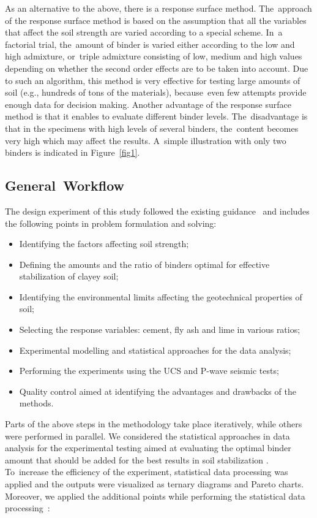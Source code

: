 \documentclass[constrmater,article,accept,pdftex,moreauthors]{Definitions/mdpi}
\begin{document}
As an alternative to the above, there is a response surface method. The~approach of the response surface method is based on the assumption that all the variables that affect the soil strength are varied according to a special scheme. In~a factorial trial, the~amount of binder is varied either according to the low and high admixture, or~triple admixture consisting of low, medium and high values depending on whether the second order effects are to be taken into account. Due to such an algorithm, this method is very effective for testing large amounts of soil (e.g., hundreds of tons of the materials), because~even few attempts provide enough data for decision making. Another advantage of the response surface method is that it enables to evaluate different binder levels. The~disadvantage is that in the specimens with high levels of several binders, the~content becomes very high which may affect the results. A~simple illustration with only two binders is indicated in Figure~\ref{fig1}.

\subsection{General~Workflow}

The design experiment of this study followed the existing guidance~\cite{Montgomery1997} and includes the following points in problem formulation and solving: 

\begin{itemize}
	\item	 Identifying the factors affecting soil strength;
	\item Defining the amounts and the ratio of binders optimal for effective stabilization of clayey soil; 
	\item Identifying the environmental limits affecting the geotechnical properties of soil;
	\item Selecting the response variables: cement, fly ash and lime in various ratios;
	\item Experimental modelling and statistical approaches for the data analysis;
	\item Performing the experiments using the UCS and P-wave seismic tests;
	\item Quality control aimed at identifying the advantages and drawbacks of the methods.
\end{itemize}

Parts of the above steps in the methodology take place iteratively, while others were performed in parallel. We considered the statistical approaches in data analysis for the experimental testing aimed at evaluating the optimal binder amount that should be added for the best results in soil stabilization \citep{Box}. To~increase the efficiency of the experiment, statistical data processing was applied and the outputs were visualized as ternary diagrams and Pareto charts. Moreover, we applied the additional points while performing the statistical data processing~\cite{Montgomery1997}: 
\end{document}
